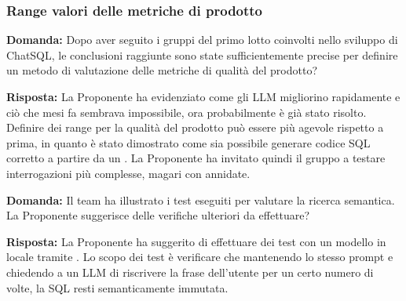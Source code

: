 \subsubsection{Range valori delle metriche di prodotto}

\par \textbf{Domanda:} Dopo aver seguito i gruppi del primo lotto coinvolti nello sviluppo di ChatSQL, le conclusioni raggiunte sono state sufficientemente precise per definire un metodo di valutazione delle metriche di qualità del prodotto?
\par \textbf{Risposta:} La Proponente ha evidenziato come gli LLM migliorino rapidamente e ciò che mesi fa sembrava impossibile, ora probabilmente è già stato risolto. Definire dei range per la qualità del prodotto può essere più agevole rispetto a prima, in quanto è stato dimostrato come sia possibile generare codice SQL corretto a partire da un . La Proponente ha invitato quindi il gruppo a testare interrogazioni più complesse, magari con  annidate.

\par \textbf{Domanda:} Il team ha illustrato i test eseguiti per valutare la ricerca semantica. La Proponente suggerisce delle verifiche ulteriori da effettuare?
\par \textbf{Risposta:} La Proponente ha suggerito di effettuare dei test con un modello in locale tramite . Lo scopo dei test è verificare che mantenendo lo stesso prompt e chiedendo a un LLM di riscrivere la frase dell'utente per un certo numero di volte, la  SQL resti semanticamente immutata.
